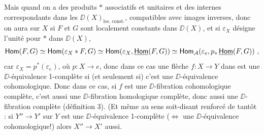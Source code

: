 Mais quand on a des produits $*$ associatifs et unitaires et des \underline{\Hom} internes correspondants dans les $\DD(X)_{\mathrm{loc.\ const.}}$, compatibles avec images inverses, donc on aura sur $X$ si $F$ et $G$ sont localement constants dans $\DD(X)$, et si $\varepsilon_X$ désigne l’unité pour $*$ dans $\DD(X)$,
\[
\Hom(F,G) \simeq \Hom(\varepsilon_X * F, G) \simeq \Hom(\varepsilon_X, \underline{\Hom}(F,G)) \simeq \Hom_{\mathcal{A}}(\varepsilon_e, p_*\, \underline{\Hom}(F,G)) \ ,
\]
car $\varepsilon_X = p^*(\varepsilon_e)$, où $p : X \to e$, donc dans ce cas une flèche $f : X \to Y$ dans \Dia{} est une $\DD$-équivalence 1-complète si (et seulement si) c’est une $\DD$-équivalence cohomologique. Donc dans ce cas, si $f$ est une $\DD$-fibration cohomologique complète, c’est aussi une $\DD$-fibration homologique complète, donc aussi une $\DD$-fibration complète (définition 3). (Et même au sens soit-disant renforcé de tantôt : si $Y'' \to Y'$ sur $Y$ est une $\DD$-équivalence 1-complète ($\Leftrightarrow$ une $\DD$-équivalence cohomologique!) alors $X'' \to X'$ aussi. %

